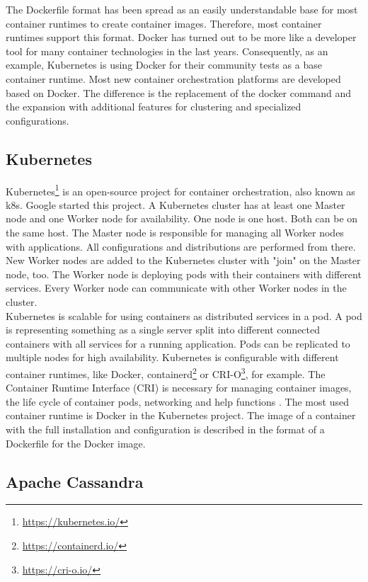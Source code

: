 The Dockerfile format has been spread as an easily understandable base for most container runtimes to create container images. Therefore, most container runtimes support this format.
Docker has turned out to be more like a developer tool for many container technologies in the last years. 
Consequently, as an example, Kubernetes is using Docker for their community tests as a base container runtime.
Most new container orchestration platforms are developed based on Docker. The difference is the replacement of the docker command and the expansion with additional features for clustering and specialized configurations.

\subsection{Kubernetes}\label{Kubernetes-Intro}

Kubernetes\footnote{\url{https://kubernetes.io/}} is an open-source project for container orchestration, also known as k8s. Google started this project. A Kubernetes cluster has at least one Master node and one Worker node for availability. One node is one host. Both can be on the same host. The Master node is responsible for managing all Worker nodes with applications. All configurations and distributions are performed from there. New Worker nodes are added to the Kubernetes cluster with "join" on the Master node, too. The Worker node is deploying pods with their containers with different services. Every Worker node can communicate with other Worker nodes in the cluster. \\
Kubernetes is scalable for using containers as distributed services in a pod. A pod is representing something as a single server split into different connected containers with all services for a running application. Pods can be replicated to multiple nodes for high availability. Kubernetes is configurable with different container runtimes, like Docker, containerd\footnote{\url{https://containerd.io/}} or CRI-O\footnote{\url{https://cri-o.io/}}, for example. The Container Runtime Interface (CRI) is necessary for managing container images, the life cycle of container pods, networking and help functions \cite[~p.16]{Scholl2019}. The most used container runtime is Docker in the Kubernetes project. The image of a container with the full installation and configuration is described in the format of a Dockerfile for the Docker image. 


\subsection{Apache Cassandra}\label{Cassandra-Intro}

